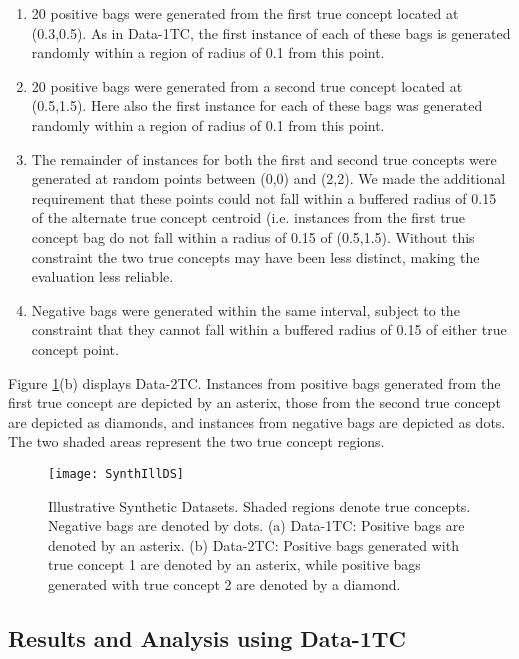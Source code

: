 \documentclass[12pt,dvips]{report}
\numberwithin{equation}{section}
\begin{document}
\begin{enumerate}
  \item 20 positive bags were generated from the first true concept located at (0.3,0.5).  As in Data-1TC, the first instance of each of these bags is generated randomly within a region of radius of 0.1 from this point.  
 \item 20 positive bags were generated from a second true concept located at (0.5,1.5).  Here also the first instance for each of these bags was generated randomly within a region of radius of 0.1 from this point.  
  \item The remainder of instances for both the first and second true concepts were generated at random points between (0,0) and (2,2).  We made the additional requirement that these points could not fall within a buffered radius of 0.15 of the alternate true concept centroid (i.e. instances from  the first true concept bag do not fall within a radius of 0.15 of (0.5,1.5).  Without this constraint the two true concepts may have been less distinct, making the evaluation less reliable.
  \item Negative bags were generated within the same interval, subject to the constraint that they cannot fall within a buffered radius of 0.15 of either true concept point.
\end{enumerate}  

Figure \ref{fig:SynthIllDS}(b) displays Data-2TC.  Instances from positive bags generated from the first true concept are depicted by an asterix, those from the second true concept are depicted as diamonds, and instances from negative bags are depicted as dots.  The two shaded areas represent the two true concept regions.

\begin{figure}[htb]
 \texttt{[image: SynthIllDS]}
 
\caption{Illustrative Synthetic Datasets.  Shaded regions denote true concepts.  Negative bags are denoted by dots.  (a) Data-1TC: Positive bags are denoted by an asterix. (b) Data-2TC: Positive bags generated with true concept 1 are denoted by an asterix, while positive bags generated with true concept 2 are denoted by a diamond.}
\label{fig:SynthIllDS}
\end{figure}

\subsection{Results and Analysis using Data-1TC}
\end{document}
